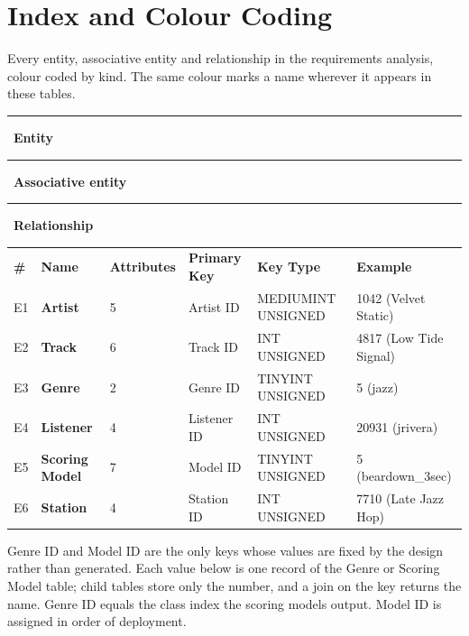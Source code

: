 \documentclass[11pt]{article}
\newcommand{\ent}[1]{\textcolor{entc}{\textbf{#1}}}
\newcommand{\asc}[1]{\textcolor{ascc}{\textbf{#1}}}
\newcommand{\rel}[1]{\textcolor{relc}{\textbf{#1}}}
\newcommand{\swatch}[1]{\textcolor{#1}{\rule{0.9em}{0.9em}}}
\begin{document}
\clearpage

\section{Index and Colour Coding}\label{sec:index}

Every entity, associative entity and relationship in the requirements analysis, colour coded by kind.
The same colour marks a name wherever it appears in these tables.

\swatch{entc}\ \ent{Entity}\qquad
\swatch{ascc}\ \asc{Associative entity}\qquad
\swatch{relc}\ \rel{Relationship}

\begin{longtable}{|L{0.35in}|L{1.25in}|L{0.80in}|L{1.05in}|T{1.30in}|L{1.20in}|}
\hline
{} \\ \hline
{}\textbf{\#} & \textbf{Name} & \textbf{Attributes} & \textbf{Primary Key} & \textbf{Key Type} & \textbf{Example} \\ \hline
E1 & \ent{Artist} & 5 & Artist ID & MEDIUMINT UNSIGNED & 1042 (Velvet Static) \\ \hline
E2 & \ent{Track} & 6 & Track ID & INT UNSIGNED & 4817 (Low Tide Signal) \\ \hline
E3 & \ent{Genre} & 2 & Genre ID & TINYINT UNSIGNED & 5 (jazz) \\ \hline
E4 & \ent{Listener} & 4 & Listener ID & INT UNSIGNED & 20931 (jrivera) \\ \hline
E5 & \ent{Scoring Model} & 7 & Model ID & TINYINT UNSIGNED & 5 (beardown\_3sec) \\ \hline
E6 & \ent{Station} & 4 & Station ID & INT UNSIGNED & 7710 (Late Jazz Hop) \\ \hline
\end{longtable}

Genre ID and Model ID are the only keys whose values are fixed by the design rather than
generated. Each value below is one record of the Genre or Scoring Model table; child tables
store only the number, and a join on the key returns the name. Genre ID equals the class
index the scoring models output. Model ID is assigned in order of deployment.
\end{document}
